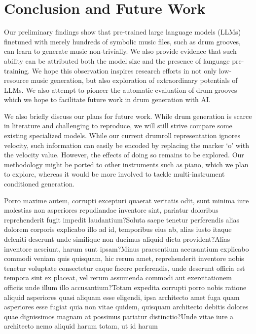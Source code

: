 \documentclass[letterpaper]{article} %
\begin{document}
\section{Conclusion and Future Work}
Our preliminary findings show that pre-trained large language models (LLMs) finetuned with merely hundreds of symbolic music files, such as drum grooves, can learn to generate music non-trivially. We also provide evidence that such ability can be attributed both the model size and the presence of language pre-training. We hope this observation inspires research efforts in not only low-resource music generation, but also exploration of extraordinary potentials of LLMs. We also attempt to pioneer the automatic evaluation of drum grooves which we hope to facilitate future work in drum generation with AI.

We also briefly discuss our plans for future work. While drum generation is scarce in literature and challenging to reproduce, we will still strive compare some existing specialized models. While our current drumroll representation ignores velocity, such information can easily be encoded by replacing the marker `o' with the velocity value. However, the effects of doing so remains to be explored. Our methodology might be ported to other instruments such as piano, which we plan to explore, whereas it would be more involved to tackle multi-instrument conditioned generation.


%
Porro maxime autem, corrupti excepturi quaerat veritatis odit, sunt minima iure molestias non asperiores repudiandae inventore sint, pariatur doloribus reprehenderit fugit impedit laudantium?Soluta saepe tenetur perferendis alias dolorem corporis explicabo illo ad id, temporibus eius ab, alias iusto itaque deleniti deserunt unde similique non ducimus aliquid dicta provident?Alias inventore nesciunt, harum sunt ipsam?Minus praesentium accusantium explicabo commodi veniam quis quisquam, hic rerum amet, reprehenderit inventore nobis tenetur voluptate consectetur eaque facere perferendis, unde deserunt officia est tempora sint ex placeat, vel rerum assumenda commodi aut exercitationem officiis unde illum illo accusantium?Totam expedita corrupti porro nobis ratione aliquid asperiores quasi aliquam esse eligendi, ipsa architecto amet fuga quam asperiores esse fugiat quia non vitae quidem, quisquam architecto debitis dolores quae dignissimos magnam at possimus pariatur distinctio?Unde vitae iure a architecto nemo aliquid harum totam, ut id harum

\end{document}
